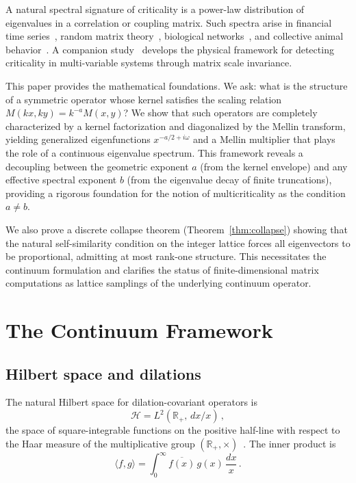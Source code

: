 \documentclass[12pt]{article}
\begin{document}
A natural spectral signature of criticality is a power-law distribution of eigenvalues in a correlation or coupling matrix. Such spectra arise in financial time series~\cite{Plerou1999,Laloux1999}, random matrix theory~\cite{Mehta2004,MarchenkoPastur1967}, biological networks~\cite{MoraBialek2011}, and collective animal behavior~\cite{Cavagna2010}. A companion study~\cite{msi2026} develops the physical framework for detecting criticality in multi-variable systems through matrix scale invariance.

This paper provides the mathematical foundations. We ask: what is the structure of a symmetric operator whose kernel satisfies the scaling relation $M(kx,ky) = k^{-a} M(x,y)$? We show that such operators are completely characterized by a kernel factorization and diagonalized by the Mellin transform, yielding generalized eigenfunctions $x^{-a/2+i\omega}$ and a Mellin multiplier that plays the role of a continuous eigenvalue spectrum. This framework reveals a decoupling between the geometric exponent $a$ (from the kernel envelope) and any effective spectral exponent $b$ (from the eigenvalue decay of finite truncations), providing a rigorous foundation for the notion of multicriticality as the condition $a \neq b$.

We also prove a discrete collapse theorem (Theorem~\ref{thm:collapse}) showing that the natural self-similarity condition on the integer lattice forces all eigenvectors to be proportional, admitting at most rank-one structure. This necessitates the continuum formulation and clarifies the status of finite-dimensional matrix computations as lattice samplings of the underlying continuum operator.


\section{The Continuum Framework}\label{sec:continuum}

\subsection{Hilbert space and dilations}

The natural Hilbert space for dilation-covariant operators is
\begin{equation}\label{eq:hilbert}
\mathcal{H} = L^2(\mathbb{R}_+,\, dx/x)\,,
\end{equation}
the space of square-integrable functions on the positive half-line with respect to the Haar measure of the multiplicative group $(\mathbb{R}_+, \times)$~\cite{ReedSimon1978,Folland1995}. The inner product is
\[
\langle f, g \rangle = \int_0^\infty \overline{f(x)}\, g(x)\, \frac{dx}{x}\,.
\]
\end{document}
